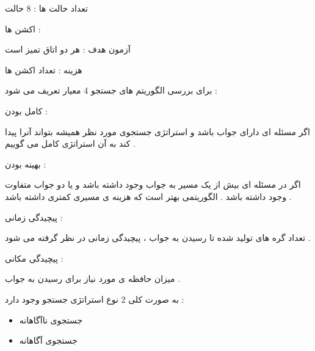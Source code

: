 \documentclass[12pt]{article}
\begin{document}
\noindent
تعداد حالت ها : 8 حالت 

\noindent
اکشن ها :

\noindent
آزمون هدف : هر دو اتاق تمیز است 


\noindent
هزینه : تعداد اکشن ها 






\newpage


\noindent
برای بررسی الگوریتم های جستجو 4 معیار تعریف می شود :


\vspace{10pt}


\noindent
کامل بودن 
 :

\noindent
اگر مسئله ای دارای جواب باشد و استراتژی جستجوی مورد نظر همیشه بتواند آنرا پیدا کند به آن استراتژی کامل می گوییم .


\vspace{10pt}


\noindent
بهینه بودن 
 :

\noindent
اگر در مسئله ای بیش از یک مسیر به جواب وجود داشته باشد و یا دو جواب متفاوت وجود داشته باشد . الگوریتمی بهتر است که هزینه ی مسیری کمتری داشته باشد .



\vspace{10pt}


\noindent
پیچیدگی زمانی 
 :

\noindent
تعداد گره های تولید شده تا رسیدن به جواب ، پیچیدگی زمانی در نظر گرفته می شود .



\vspace{10pt}


\noindent
پیچیدگی مکانی 
 :

\noindent
میزان حافظه ی مورد نیاز برای رسیدن به جواب .


\vspace{30pt}


\noindent
به صورت کلی 2 نوع استراتژی جستجو وجود دارد :

\begin{itemize}
	\item جستجوی ناآگاهانه
	\item جستجوی آگاهانه
\end{itemize}
\end{document}
